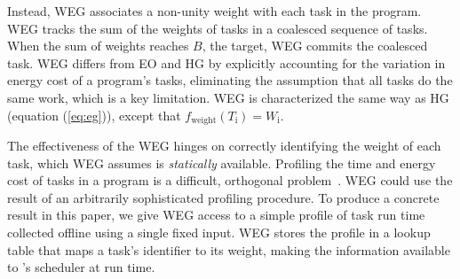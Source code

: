 Instead, WEG associates a non-unity weight with each task in the program. WEG tracks the sum of the weights of tasks in a coalesced sequence of tasks. When the sum of weights reaches $B$, the target, WEG commits the coalesced task. WEG differs from EO and HG by explicitly accounting for the variation in energy cost of a program's tasks, eliminating the assumption that all tasks do the same work, which is a key limitation. WEG is characterized the same way as HG (equation (\ref{eq:eg})), except that $f_\text{weight}(T_\text{i}) = W_\text{i}$.

The effectiveness of the WEG hinges on correctly identifying the weight of each task, which WEG assumes is {\em statically} available. Profiling the time and energy cost of tasks in a program is a difficult, orthogonal problem~\cite{cleancut_2018,baghsorkhi_cgo_2018}. WEG could use the result of an arbitrarily sophisticated profiling procedure. To produce a concrete result in this paper, we give WEG access to a simple profile of task run time collected offline using a single fixed input. WEG stores the profile in a lookup table that maps a task's identifier to its weight, making the information available to \sys's scheduler at run time.